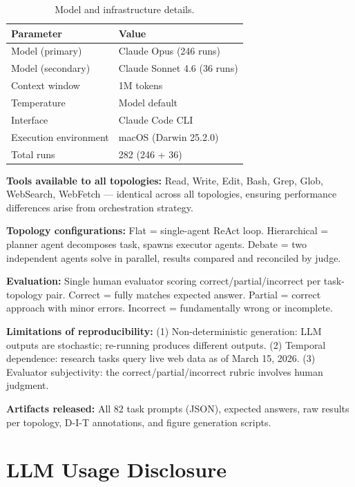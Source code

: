 \begin{table}[h]
\centering
\caption{Model and infrastructure details.}
\label{tab:infrastructure}
\small
\begin{tabular}{ll}
\toprule
\textbf{Parameter} & \textbf{Value} \\
\midrule
Model (primary) & Claude Opus (246 runs) \\
Model (secondary) & Claude Sonnet 4.6 (36 runs) \\
Context window & 1M tokens \\
Temperature & Model default \\
Interface & Claude Code CLI \\
Execution environment & macOS (Darwin 25.2.0) \\
Total runs & 282 (246 + 36) \\
\bottomrule
\end{tabular}
\end{table}

\textbf{Tools available to all topologies:} Read, Write, Edit, Bash, Grep, Glob, WebSearch, WebFetch --- identical across all topologies, ensuring performance differences arise from orchestration strategy.

\textbf{Topology configurations:} Flat = single-agent ReAct loop. Hierarchical = planner agent decomposes task, spawns executor agents. Debate = two independent agents solve in parallel, results compared and reconciled by judge.

\textbf{Evaluation:} Single human evaluator scoring correct/partial/incorrect per task-topology pair. Correct = fully matches expected answer. Partial = correct approach with minor errors. Incorrect = fundamentally wrong or incomplete.

\textbf{Limitations of reproducibility:} (1) Non-deterministic generation: LLM outputs are stochastic; re-running produces different outputs. (2) Temporal dependence: research tasks query live web data as of March 15, 2026. (3) Evaluator subjectivity: the correct/partial/incorrect rubric involves human judgment.

\textbf{Artifacts released:} All 82 task prompts (JSON), expected answers, raw results per topology, D-I-T annotations, and figure generation scripts.

\section{LLM Usage Disclosure}
\label{app:llm_disclosure}

